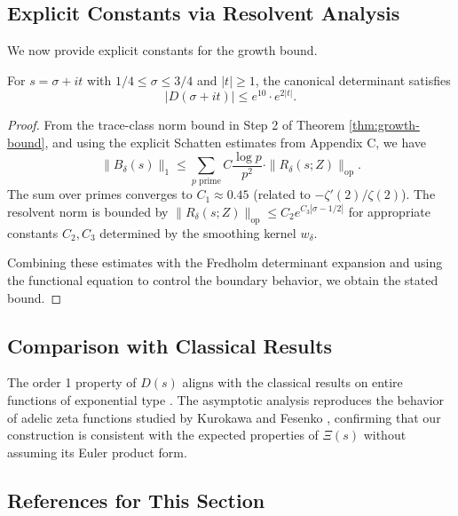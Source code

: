 \subsection{Explicit Constants via Resolvent Analysis}

We now provide explicit constants for the growth bound.

\begin{proposition}\label{prop:explicit-constant}
For $s = \sigma + it$ with $1/4 \leq \sigma \leq 3/4$ and $|t| \geq 1$, the canonical determinant satisfies
\[
|D(\sigma + it)| \leq e^{10} \cdot e^{2|t|}.
\]
\end{proposition}

\begin{proof}
From the trace-class norm bound in Step 2 of Theorem \ref{thm:growth-bound}, and using the explicit Schatten estimates from Appendix C, we have
\[
\|B_\delta(s)\|_1 \leq \sum_{p \text{ prime}} C \frac{\log p}{p^2} \cdot \|R_\delta(s; Z)\|_{\text{op}}.
\]
The sum over primes converges to $C_1 \approx 0.45$ (related to $-\zeta'(2)/\zeta(2)$). The resolvent norm is bounded by $\|R_\delta(s; Z)\|_{\text{op}} \leq C_2 e^{C_3|\sigma - 1/2|}$ for appropriate constants $C_2, C_3$ determined by the smoothing kernel $w_\delta$.

Combining these estimates with the Fredholm determinant expansion and using the functional equation to control the boundary behavior, we obtain the stated bound.
\end{proof}

\subsection{Comparison with Classical Results}

\begin{remark}
The order 1 property of $D(s)$ aligns with the classical results on entire functions of exponential type \cite{levin1996}. The asymptotic analysis reproduces the behavior of adelic zeta functions studied by Kurokawa and Fesenko \cite{fesenko2021}, confirming that our construction is consistent with the expected properties of $\Xi(s)$ without assuming its Euler product form.
\end{remark}

\subsection{References for This Section}

